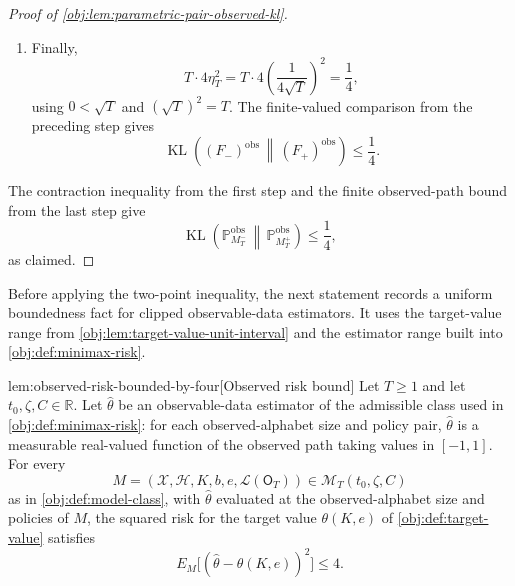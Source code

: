 \documentclass[11pt]{article}
\begin{document}
\begin{proof}[Proof of \cref{obj:lem:parametric-pair-observed-kl}]
\begin{enumerate}
\item
Finally,
\[
T\cdot 4\eta_T^2
=
T\cdot 4\left(\frac{1}{4\sqrt T}\right)^2
=
\frac14,
\]
using \(0<\sqrt T\) and \((\sqrt T)^2=T\).  The finite-valued comparison from the preceding step gives
\[
\operatorname{KL}\!\left(
(F_-)^{\mathrm{obs}}
\,\middle\|\,
(F_+)^{\mathrm{obs}}
\right)
\le
\frac14.
\] %
\end{enumerate}

The contraction inequality from the first step and the finite observed-path bound from the last step
give
\[
\operatorname{KL}\!\left(
\mathbb P^{\mathrm{obs}}_{M_T^-}
\,\middle\|\,
\mathbb P^{\mathrm{obs}}_{M_T^+}
\right)
\le
\frac14,
\]
as claimed. %
\end{proof}

Before applying the two-point inequality, the next statement records a uniform boundedness fact for clipped observable-data estimators. It uses the target-value range from \cref{obj:lem:target-value-unit-interval} and the estimator range built into \cref{obj:def:minimax-risk}.

\begin{lemmav}{lem:observed-risk-bounded-by-four}[Observed risk bound]
Let \(T\ge 1\) and let \(t_0,\zeta,C\in\mathbb R\). Let \(\widehat\theta\) be an observable-data estimator of the admissible class used in \cref{obj:def:minimax-risk}: for each observed-alphabet size and policy pair, \(\widehat\theta\) is a measurable real-valued function of the observed path taking values in \([-1,1]\). For every
\[
M=(\mathcal X,\mathcal H,K,b,e,\mathcal L(\mathsf O_T))\in \mathcal M_T(t_0,\zeta,C)
\]
as in \cref{obj:def:model-class}, with \(\widehat\theta\) evaluated at the observed-alphabet size and policies of \(M\), the squared risk for the target value \(\theta(K,e)\) of \cref{obj:def:target-value} satisfies
\[
E_M\bigl[(\widehat\theta-\theta(K,e))^2\bigr]\le 4 .
\]
\end{lemmav}
\end{document}
